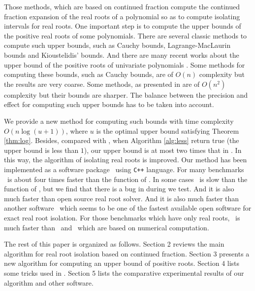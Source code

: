 Those methods, which are  based on  continued fraction compute the continued fraction expansion of the real roots of a polynomial so as to  compute isolating intervals for real roots. One important step
is to  compute the upper bounds of the positive real roots of some polynomials. There are  several classic methods to compute such upper bounds, such as Cauchy bounds, Lagrange-MacLaurin  bounds and Kioustelidis' bounds. And there are many recent works about the upper bound of the positive roots of univariate polynomials \cite{hong98,ste05,akr05,akr06,akr08}. Some methods for computing these bounds,  such as Cauchy bounds, are of $O(n)$ complexity but the results are very coarse. Some methods, as presented in  \cite{akr08} are of $O(n^2)$ complexity but their bounds are sharper. The balance between the precision and effect for computing such upper bounds has to be taken into account.

We provide a new method for computing such bounds with time complexity $O(n\log(u+1))$, where $u$ is the optimal upper bound satisfying Theorem \ref{thm:log}. Besides, compared
with \cite{akr08}, when  Algorithm \ref{alg:less} return true (the upper bound is less than $1$), our upper bound is at most two times that in \cite{akr08}. In this way, the algorithm of   isolating real roots is improved.  Our  method has been implemented as a  software package \froot\ using \texttt{C++} language. {\color{red}For many benchmarks \froot \  is about four  times
faster   than  the function {\tt \REALROOT} of \MAPLE}.  {\color{red}In some cases \froot\ is slow than the function {\tt \inte} of \MM, but we find that there is a bug in  {\tt \inte} during we test. And it  is also much faster than   open source real root solver.} And it  is also much faster than   another software   \cf\  which seems to be one of the
fastest available open software for exact real root isolation. For those  benchmarks which  have only real roots, \froot\ is much faster than \sle\ and \eign\ which are based on numerical computation. 


The rest of this paper is organized as follows. Section 2 reviews the
main algorithm for real root isolation based on  continued fraction. Section 3 presents a new algorithm for
computing an upper bound of positive roots. Section 4 lists some tricks used in \froot.  Section 5 lists the comparative experimental results of our algorithm and other software. %